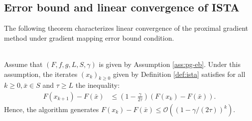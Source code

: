 \documentclass[12pt]{article}
\begin{document}
    \subsection{Error bound and linear convergence of ISTA}
        The following theorem characterizes linear convergence of the proximal gradient method under gradient mapping error bound condition. 
        \begin{theorem}\;\label{thm:lin-cnvg-ista-eb}\\
            Assume that $(F, f, g, L, S, \gamma)$ is given by Assumption \ref{ass:pg-eb}. 
            Under this assumption, the iterates $(x_k)_{k \ge 0}$ given by Definition \ref{def:ista} satisfies for all $k \ge 0, \bar x \in S$ and $\tau \ge L$ the inequality: 
            \begin{align*}
                F(x_{k + 1}) - F(\bar x)
                &\le 
                \left(
                    1 - \frac{\gamma}{2\tau}
                \right)(F(x_k) - F(\bar x)). 
            \end{align*}
            Hence, the algorithm generates $F(x_k) - F(\bar x)\le \mathcal O((1 - \gamma/(2\tau))^k)$. 
        \end{theorem}
\end{document}
